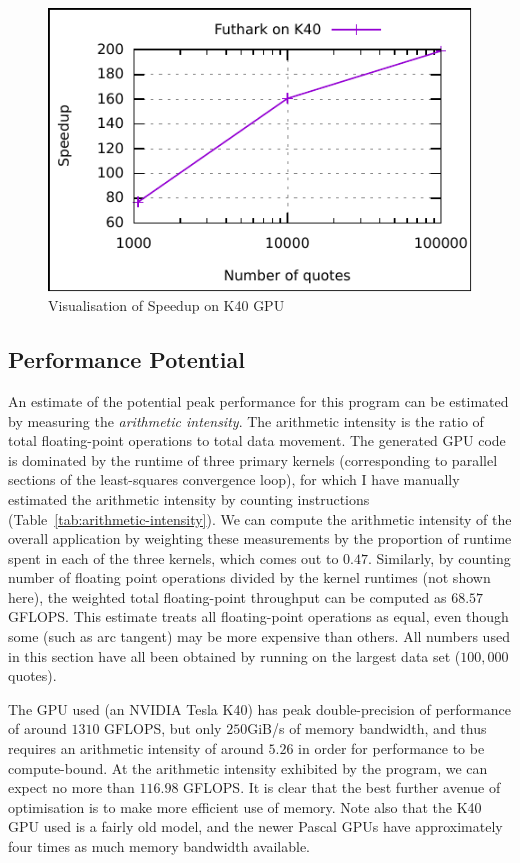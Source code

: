 \documentclass{article}
\begin{document}
\begin{figure}
  \centering
  \includegraphics{speedup.pdf}
  \caption{Visualisation of Speedup on K40 GPU}
  \label{fig:speedups}
\end{figure}

\subsection{Performance Potential}

An estimate of the potential peak performance for this program can be
estimated by measuring the \textit{arithmetic intensity}.  The
arithmetic intensity is the ratio of total floating-point operations
to total data movement.  The generated GPU code is dominated by the
runtime of three primary kernels (corresponding to parallel sections
of the least-squares convergence loop), for which I have manually
estimated the arithmetic intensity by counting instructions
(Table~\ref{tab:arithmetic-intensity}).  We can compute the arithmetic
intensity of the overall application by weighting these measurements
by the proportion of runtime spent in each of the three kernels, which
comes out to $0.47$.  Similarly, by counting number of floating point
operations divided by the kernel runtimes (not shown here), the
weighted total floating-point throughput can be computed as $68.57$
GFLOPS.  This estimate treats all floating-point operations as equal,
even though some (such as arc tangent) may be more expensive than
others.  All numbers used in this section have all been obtained by
running on the largest data set ($100,000$ quotes).

The GPU used (an NVIDIA Tesla K40) has peak double-precision of
performance of around $1310$ GFLOPS, but only $250$GiB/s of memory
bandwidth, and thus requires an arithmetic intensity of around $5.26$
in order for performance to be compute-bound.  At the arithmetic
intensity exhibited by the program, we can expect no more than
$116.98$ GFLOPS.  It is clear that the best further avenue of
optimisation is to make more efficient use of memory.  Note also that
the K40 GPU used is a fairly old model, and the newer Pascal GPUs have
approximately four times as much memory bandwidth available.
\end{document}
